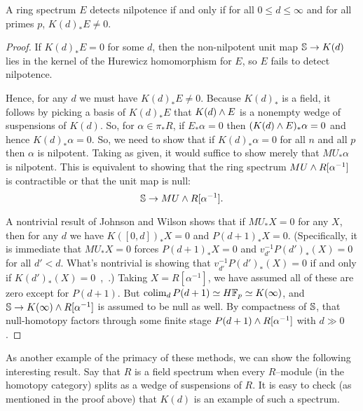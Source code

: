 \begin{corollary}\label{LocalNilpotenceDetection}
A ring spectrum $E$ detects nilpotence if and only if for all $0 \le d \le \infty$ and for all primes $p$, $K(d)_* E \ne 0$.
\end{corollary}
\begin{proof}
If $K(d)_* E = 0$ for some $d$, then the non-nilpotent unit map $\S \to K(d)$ lies in the kernel of the Hurewicz homomorphism for $E$, so $E$ fails to detect nilpotence.

Hence, for any $d$ we must have $K(d)_* E \ne 0$.  Because $K(d)_*$ is a field, it follows by picking a basis of $K(d)_* E$ that $K(d) \sm E$ is a nonempty wedge of suspensions of $K(d)$.  So, for $\alpha \in \pi_* R$, if $E_* \alpha = 0$ then $(K(d) \sm E)_* \alpha = 0$ and hence $K(d)_* \alpha = 0$.  So, we need to show that if $K(d)_* \alpha = 0$ for all $n$ and all $p$ then $\alpha$ is nilpotent.  Taking  as given, it would suffice to show merely that $MU_* \alpha$ is nilpotent.  This is equivalent to showing that the ring spectrum $MU \sm R[\alpha^{-1}]$ is contractible or that the unit map is null: \[\S \to MU \sm R[\alpha^{-1}].\]

A nontrivial result of Johnson and Wilson shows that if $MU_* X = 0$ for any $X$, then for any $d$ we have $K([0, d])_* X = 0$ and $P(d+1)_* X = 0$.  (Specifically, it is immediate that $MU_* X = 0$ forces $P(d+1)_* X = 0$ and $v_{d'}^{-1} P(d')_*(X) = 0$ for all $d' < d$.  What's nontrivial is showing that $v_{d'}^{-1} P(d')_*(X) = 0$ if and only if $K(d')_*(X) = 0$~\cite[Theorem 2.1.a]{RavenelLocalizationWRTPeriodic},~\cite[Section 3]{JohnsonWilson}.)  Taking $X = R[\alpha^{-1}]$, we have assumed all of these are zero except for $P(d+1)$.  But $\colim_d P(d+1) \simeq H\F_p \simeq K(\infty)$, and $\S \to K(\infty) \sm R[\alpha^{-1}]$ is assumed to be null as well.  By compactness of $\S$, that null-homotopy factors through some finite stage $P(d+1) \sm R[\alpha^{-1}]$ with $d \gg 0$.
\end{proof}

As another example of the primacy of these methods, we can show the following interesting result.  Say that $R$ is a field spectrum when every $R$--module (in the homotopy category) splits as a wedge of suspensions of $R$.  It is easy to check (as mentioned in the proof above) that $K(d)$ is an example of such a spectrum.

